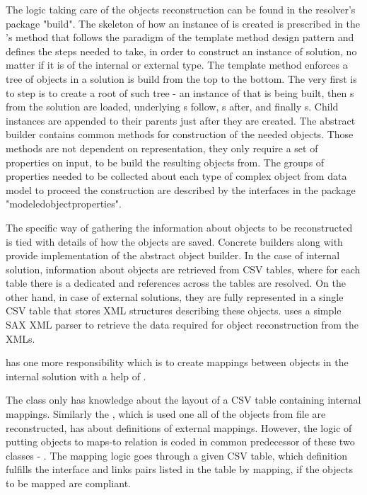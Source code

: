 The logic taking care of the objects reconstruction can be found in the resolver's package "build".
The skeleton of how an instance of  is created is prescribed in the 's method  that follows the paradigm of the template method design pattern and defines the steps needed to take, in order to construct an instance of  solution, no matter if it is of the internal or external type.
The template method enforces a tree of objects in a solution is build from the top to the bottom.
The very first is to step is to create a root of such tree - an instance of  that is being built, then s from the solution are loaded, underlying s follow, s after, and finally s. 
Child instances are appended to their parents just after they are created.
The abstract builder contains common methods for construction of the needed objects. 
Those methods are not dependent on representation, they only require a set of properties on input, to be build the resulting objects from. 
The groups of properties needed to be collected about each type of complex object from data model to proceed the construction are described by the interfaces in the package "modeledobjectproperties".

The specific way of gathering the information about objects to be reconstructed is tied with details of how the objects are saved. 
Concrete builders  along with  provide implementation of the abstract object builder.
In the case of internal solution, information about objects are retrieved from CSV tables, where for each table there is a dedicated and references across the tables are resolved.
On the other hand, in case of external solutions, they are fully represented in a single CSV table that stores XML structures describing these objects. 
 uses a simple SAX XML parser to retrieve the data required for object reconstruction from the XMLs.

 has one more responsibility which is to create mappings between  objects in the internal solution with a help of . 

The  class only has knowledge about the layout of a CSV table containing internal mappings. Similarly the , which is used one all of the objects from file are reconstructed, has about definitions of external mappings. 
However, the logic of putting objects to maps-to relation is coded in common predecessor of these two classes - .
The mapping logic goes through a given CSV table, which definition fulfills the interface  and links pairs listed in the table by mapping, if the objects to be mapped are compliant.

